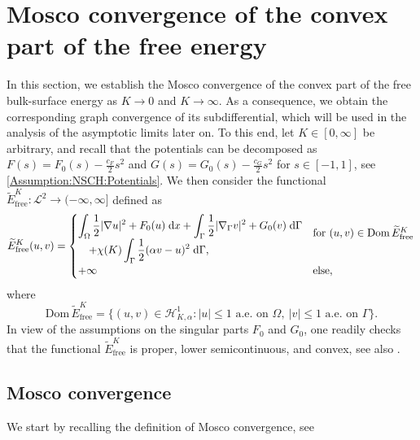 \documentclass[11pt,reqno]{amsart}
\theoremstyle{remark}
\numberwithin{equation}{section}
\newcommand{\abs}[1]{|#1|}
\newcommand{\intO}{\int_\Omega}
\newcommand{\intG}{\int_\Gamma}
\newcommand{\dx}{\;\mathrm{d}x}
\newcommand{\dG}{\;\mathrm d\Ga}
\newcommand{\Grad}{\nabla}
\newcommand{\Gradg}{\nabla_\Ga}
\newcommand{\Om}{\Omega}
\newcommand{\Ga}{\Gamma}
\newcommand{\free}{\mathrm{free}}
\begin{document}
\section{Mosco convergence of the convex part of the free energy}
\label{Section:MoscoConvergence}

In this section, we establish the Mosco convergence of the convex part of the free bulk-surface energy as $K\rightarrow 0$ and $K\rightarrow\infty$. As a consequence, we obtain the corresponding graph convergence of its subdifferential, which will be used in the analysis of the asymptotic limits later on. To this end, let $K\in[0,\infty]$ be arbitrary, and recall that the potentials can be decomposed as $F(s) = F_0(s) - \frac{c_F}{2}s^2$ and $G(s) = G_0(s) - \frac{c_G}{2}s^2$ for $s\in[-1,1]$, see \ref{Assumption:NSCH:Potentials}. We then consider the functional $\widetilde{E}_\free^K: \mathcal{L}^2 \to (-\infty,\infty]$ defined as
\begin{align*}
    \widetilde{E}_\free^K(u,v) = 
    \begin{cases} 
    \displaystyle\intO \frac12\abs{\Grad u}^2 + F_0(u)\dx + \intG \frac12\abs{\Gradg v}^2 + G_0(v)\dG 
    &\smash{\raisebox{-1.6ex}
    {\text{for~}$(u,v)\in\mathrm{Dom}\,\widetilde E_\free^K$}} 
    \\
    \quad + \displaystyle\chi(K) \intG \frac12 (\alpha v - u)^2 \dG, 
    \\
    +\infty &\text{else},
    \end{cases}
\end{align*}
where
\begin{equation*}
    \mathrm{Dom}\,\widetilde{E}_\free^K = \big\{(u,v)\in\mathcal{H}^1_{K,\alpha}: \abs{u}\leq 1 
    \text{~a.e.~on~}\Om, \ \abs{v}\leq 1 \text{~a.e.~on~}\Ga\big\}.
\end{equation*}
In view of the assumptions on the singular parts $F_0$ and $G_0$, one readily checks that the functional $\widetilde E_\free^K$ is proper, lower semicontinuous, and convex, see also \cite[Lemma~4.1]{Giorgini2026}.

\subsection{Mosco convergence}

We start by recalling the definition of Mosco convergence, see \cite[Section~3.3, Definition~3.17]{Attouch1984}
\end{document}
